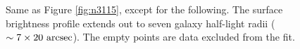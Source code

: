 \documentclass[useAMS,usenatbib,article]{mn2e}
\begin{document}
\begin{figure}
\begin{center}
{Same as Figure \ref{fig:n3115}, except for the following. 
The surface brightness profile extends out to seven galaxy half-light radii ($\sim 7 \times 20~\rm arcsec$). 
The empty points are data excluded from the fit. 
}
\label{fig:n1332}
\end{center}
\end{figure}
\end{document}
